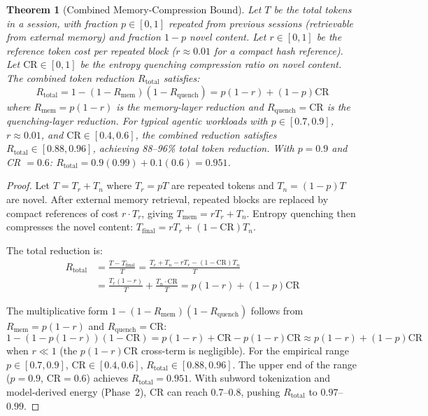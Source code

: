 \documentclass[11pt]{article}
\newtheorem{theorem}{Theorem}[section]
\theoremstyle{remark}
\begin{document}
\begin{theorem}[Combined Memory-Compression Bound]
\label{thm:combined-bound}
Let $T$ be the total tokens in a session, with fraction $p \in [0,1]$ repeated
from previous sessions (retrievable from external memory) and fraction
$1-p$ novel content. Let $r \in [0,1]$ be the reference token cost per
repeated block ($r \approx 0.01$ for a compact hash reference). Let
$\text{CR} \in [0,1]$ be the entropy quenching compression ratio on novel
content. The combined token reduction $R_{\text{total}}$ satisfies:
\begin{equation}
    R_{\text{total}} = 1 - (1 - R_{\text{mem}})(1 - R_{\text{quench}})
    = p(1-r) + (1-p)\text{CR}
\end{equation}
where $R_{\text{mem}} = p(1-r)$ is the memory-layer reduction and
$R_{\text{quench}} = \text{CR}$ is the quenching-layer reduction.
For typical agentic workloads with $p \in [0.7, 0.9]$, $r \approx 0.01$,
and $\text{CR} \in [0.4, 0.6]$, the combined reduction satisfies
$R_{\text{total}} \in [0.88, 0.96]$, achieving 88--96\% total token
reduction. With $p = 0.9$ and CR $= 0.6$: $R_{\text{total}} = 0.9(0.99)
+ 0.1(0.6) = 0.951$.
\end{theorem}

\begin{proof}
Let $T = T_r + T_n$ where $T_r = pT$ are repeated tokens and $T_n = (1-p)T$
are novel. After external memory retrieval, repeated blocks are replaced by
compact references of cost $r \cdot T_r$, giving $T_{\text{mem}} = rT_r + T_n$.
Entropy quenching then compresses the novel content: $T_{\text{final}} =
rT_r + (1-\text{CR})T_n$.

The total reduction is:
\begin{align}
    R_{\text{total}} &= \frac{T - T_{\text{final}}}{T}
    = \frac{T_r + T_n - rT_r - (1-\text{CR})T_n}{T} \\
    &= \frac{T_r(1-r)}{T} + \frac{T_n \cdot \text{CR}}{T}
    = p(1-r) + (1-p)\text{CR}
\end{align}

The multiplicative form $1 - (1-R_{\text{mem}})(1-R_{\text{quench}})$ follows
from $R_{\text{mem}} = p(1-r)$ and $R_{\text{quench}} = \text{CR}$:
\begin{equation}
    1 - (1-p(1-r))(1-\text{CR}) = p(1-r) + \text{CR} - p(1-r)\text{CR}
    \approx p(1-r) + (1-p)\text{CR}
\end{equation}
when $r \ll 1$ (the $p(1-r)\text{CR}$ cross-term is negligible). For the
empirical range $p \in [0.7, 0.9]$, $\text{CR} \in [0.4, 0.6]$,
$R_{\text{total}} \in [0.88, 0.96]$. The upper end of the range
($p = 0.9$, $\text{CR} = 0.6$) achieves $R_{\text{total}} = 0.951$.
With subword tokenization and model-derived energy (Phase~2), CR can reach
0.7--0.8, pushing $R_{\text{total}}$ to $0.97$--$0.99$.
\end{proof}
\end{document}
